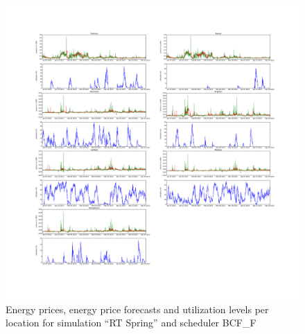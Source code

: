 \begin{figure}[htbp]
	\centering
	\vspace*{-0.6in}
	\hspace*{-1.4in}
		\includegraphics[width=1.60\textwidth]{figures/appendix_simulation_results/RT_Spring_scenario_3.pdf}
	\vspace*{-1.0in}
	\caption{Energy prices, energy price forecasts and utilization levels per location for simulation ``RT Spring'' and scheduler BCF\_F}
	\label{fig:app_RT_Spring_scenario_3}
\end{figure}

